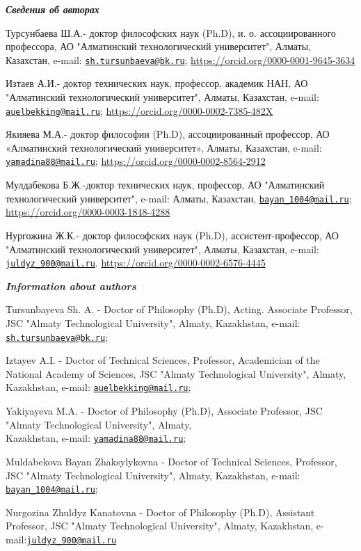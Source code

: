 \begin{authorinfo}
\emph{{\bfseries Сведения об авторах}}

Турсунбаева Ш.А.- доктор философских наук (Ph.D), и. о. ассоциированного
профессора, АО "Алматинский технологический университет", Алматы,
Казахстан, e-mail:
\href{mailto:sh.tursunbaeva@bk.ru}{\nolinkurl{sh.tursunbaeva@bk.ru}};
\url{https://orcid.org/0000-0001-9645-3634}

Изтаев А.И.- доктор технических наук, профессор, академик НАН, АО
"Алматинский технологический университет", Алматы, Казахстан, e-mail:
\href{mailto:auelbekking@mail.ru}{\nolinkurl{auelbekking@mail.ru}};
\url{https://orcid.org/0000-0002-7385-482X}

Якияева М.А.- доктор философии (Ph.D), ассоциированный профессор, АО
«Алматинский технологический университет», Алматы, Казахстан, e-mail:
\href{mailto:yamadina88@mail.ru}{\nolinkurl{yamadina88@mail.ru}};
\url{https://orcid.org/0000-0002-8564-2912}

Мулдабекова Б.Ж.-доктор технических наук, профессор, АО "Алматинский
технологический университет", e-mail: Алматы, Казахстан,
\href{mailto:bayan\_1004@mail.ru}{\nolinkurl{bayan\_1004@mail.ru}};
\url{https://orcid.org/0000-0003-1848-4288}

Нургожина Ж.К.- доктор философских наук (Ph.D), ассистент-профессор, АО
"Алматинский технологический университет", Алматы, Казахстан, e-mail:
\href{mailto:juldyz\_900@mail.ru}{\nolinkurl{juldyz\_900@mail.ru}}.
\url{https://orcid.org/0000-0002-6576-4445}

\emph{{\bfseries Information about authors}}

Tursunbayeva Sh. A. - Doctor of Philosophy (Ph.D), Acting. Associate
Professor, JSC "Almaty Technological University", Almaty, Kazakhstan,
e-mail:
\href{mailto:sh.tursunbaeva@bk.ru}{\nolinkurl{sh.tursunbaeva@bk.ru}};

Iztayev A.I. - Doctor of Technical Sciences, Professor, Academician of
the National Academy of Sciences, JSC "Almaty Technological University",
Almaty, Kazakhstan, e-mail:
\href{mailto:auelbekking@mail.ru}{\nolinkurl{auelbekking@mail.ru}};

Yakiyayeva M.A. - Doctor of Philosophy (Ph.D), Associate Professor, JSC
"Almaty Technological University", Almaty, \\Kazakhstan, e-mail:
\href{mailto:yamadina88@mail.ru}{\nolinkurl{yamadina88@mail.ru}};

Muldabekova Bayan Zhaksylykovna - Doctor of Technical Sciences,
Professor, JSC "Almaty Technological University", Almaty, Kazakhstan,
e-mail:
\href{mailto:bayan\_1004@mail.ru}{\nolinkurl{bayan\_1004@mail.ru}};

Nurgozina Zhuldyz Kanatovna - Doctor of Philosophy (Ph.D), Assistant
Professor, JSC "Almaty Technological University", Almaty, Kazakhstan,
e-mail:\href{mailto:juldyz\_900@mail.ru}{\nolinkurl{juldyz\_900@mail.ru}}
\end{authorinfo}
